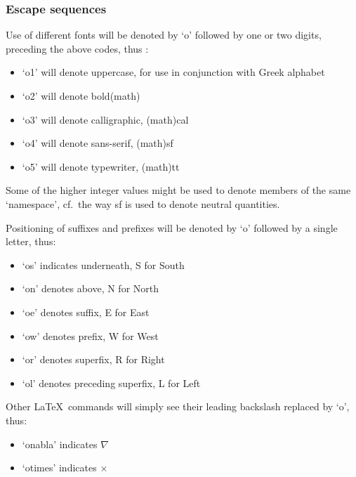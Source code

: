 \subsubsection{Escape sequences}\label{sec:escape-sequences}

Use of different fonts will be denoted by `o' followed by one or two
digits, preceding the above codes, thus :

\begin{itemize}
\item `o1' will denote uppercase, for use in conjunction with Greek alphabet
\item `o2' will denote bold(math)
\item `o3' will denote calligraphic, (math)cal
\item `o4' will denote sans-serif, (math)sf
\item `o5' will denote typewriter, (math)tt
\end{itemize}

Some of the higher integer values might be used to denote members of the
same `namespace', cf.~the way sf is used to denote neutral quantities.

Positioning of suffixes and prefixes will be denoted by `o' followed by
a single letter, thus:

\begin{itemize}
\item `os' indicates underneath, S for South
\item `on' denotes above, N for North
\item `oe' denotes suffix, E for East
\item `ow' denotes prefix, W for West
\item `or' denotes superfix, R for Right
\item `ol' denotes preceding superfix, L for Left
\end{itemize}

Other \LaTeX \ commands will simply see their leading backslash replaced by
`o', thus:

\begin{itemize}
\item `onabla' indicates $\nabla$
\item `otimes' indicates $\times$
\end{itemize}
